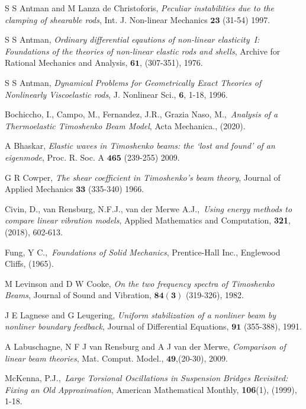 \documentclass[main.tex]{subfiles}
\begin{document}
\begin{thebibliography}{AAA}
 S S Antman and M Lanza de Christoforis, {\it Peculiar
instabilities due to the clamping of shearable rods}, Int. J.
Non-linear Mechanics $\mathbf{23}$ (31-54) 1997.

 S S Antman, {\it Ordinary differential eqautions of
non-linear elasticity~I: Foundations of the theories of non-linear
elastic rods and shells}, Archive for Rational Mechanics and
Analysis, $\mathbf{61}$, (307-351), 1976.

 S S Antman, {\it Dynamical Problems for Geometrically
Exact Theories of Nonlinearly Viscoelastic rods}, J. Nonlinear Sci.,
$\mathbf{6}$, 1-18, 1996.

 Bochiccho, I., Campo, M., Fernandez, J.R., Grazia Naso, M.,\ \textit{Analysis of a Thermoelastic Timoshenko Beam Model}, Acta Mechanica., (2020).

 A Bhaskar, {\it Elastic waves in Timoshenko beams: the
`lost and found' of an eigenmode}, Proc. R. Soc. A $\mathbf{465}$
(239-255) 2009.

 G R Cowper, {\it The shear coefficient in Timoshenko's beam
theory}, Journal of Applied Mechanics $\mathbf{33}$ (335-340) 1966.

 Civin, D., van Rensburg, N.F.J., van der Merwe A.J.,\ \textit{Using energy methods to compare linear vibration models}, Applied Mathematics and Computation, \textbf{321}, (2018), 602-613.

 Fung, Y C.,\ \textit{Foundations of Solid Mechanics}, Prentice-Hall Inc., Englewood Cliffs, (1965).

 M Levinson and D W Cooke, {\it On the two frequency spectra of Timoshenko Beams}, Journal of
Sound and Vibration, $\mathbf{84(3)}$ (319-326), 1982.

 J E Lagnese and G Leugering, {\it Uniform stabilization of
a nonliner beam by nonliner boundary feedback}, Journal of
Differential Equations, $\mathbf{91}$ (355-388), 1991.

 A Labuschagne, N F J van Rensburg and A J van der Merwe,
{\it Comparison of linear  beam theories}, Mat. Comput. Model.,
$\mathbf{49}$,(20-30), 2009.

 McKenna, P.J.,\ \textit{Large Torsional Oscillations in Suspension Bridges Revisited: Fixing an Old Approximation}, American Mathematical Monthly, \textbf{106}(1), (1999), 1-18.


\end{thebibliography}
\end{document}
